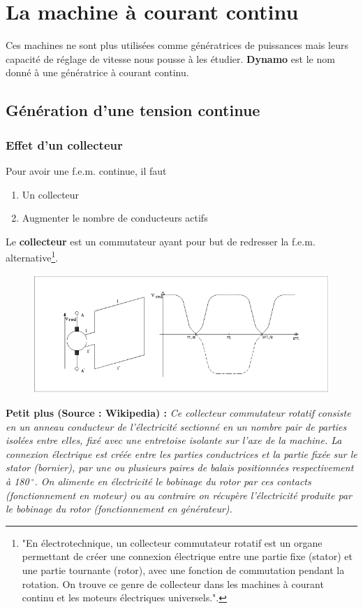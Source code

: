 \chapter{La machine à courant continu}
Ces machines ne sont plus utilisées comme génératrices de puissances 
mais leurs capacité de réglage de vitesse nous pousse à les étudier. 
\textbf{Dynamo} est le nom donné à une génératrice à courant continu.

\section{Génération d'une tension continue}
	\subsection{Effet d'un collecteur}
	Pour avoir une f.e.m. continue, il faut 
	\begin{enumerate}
	\item Un collecteur
	\item Augmenter le nombre de conducteurs actifs
	\end{enumerate}
	Le \textbf{collecteur} est un commutateur ayant pour but de 
	redresser la f.e.m. alternative\footnote{"En électrotechnique, 
	un collecteur commutateur rotatif est un organe permettant de 
	créer 	une connexion électrique entre une partie fixe (stator) 
	et une 	partie tournante (rotor), avec une fonction de 
	commutation pendant la rotation. On trouve ce genre de 
	collecteur dans les machines à courant continu et les moteurs 
	électriques universels.".}.\\
	\begin{figure}
	\vspace{-5mm}
	\includegraphics[scale=0.34]{ch4/image1.png}
	\end{figure}
	\textbf{Petit plus (Source : Wikipedia) :} \textit{Ce collecteur 
	commutateur rotatif consiste en un anneau conducteur de l'électricité  
	sectionné en un nombre pair de parties 
	isolées entre elles, fixé avec une entretoise isolante sur l'axe de 
	la machine. La connexion électrique est créée entre les parties 
	conductrices et la partie fixée sur le stator (bornier), par une ou 
	plusieurs paires de balais positionnées respectivement à 180$\ ^\circ$. 
	On alimente en électricité le bobinage du rotor par ces contacts 
	(fonctionnement en moteur) ou au contraire on récupère l'électricité 
	produite par le bobinage du rotor (fonctionnement en générateur).}\ \\
	
